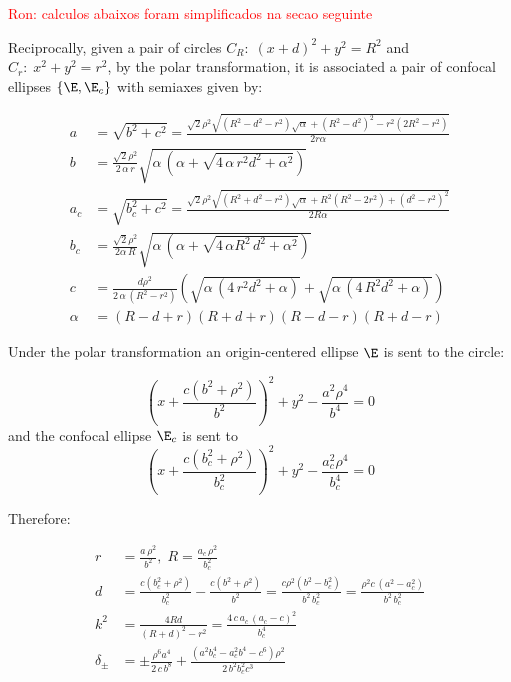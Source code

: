  
 \textcolor{red}{Ron: calculos abaixos foram simplificados na secao seguinte}
 
 
 Reciprocally, given a pair of circles $C_R:\; (x+d)^2+y^2=R^2$ and $C_r:\; x^2+y^2=r^2$, by the  polar transformation, 
 it is associated a pair of confocal ellipses $\{\E, \E_c\}$
 with semiaxes given by:
 
 \begin{align*}
     a&= \sqrt{b^2+c^2}=\frac{\sqrt{2}\rho^2\sqrt{ (R^2 - d^2 - r^2)\sqrt{\alpha} +(R^2 - d^2)^2  - r^2(2R^2 - r^2) }}{2r\alpha} \\
     b&= {\frac {\sqrt {2}{\rho}^{2}}{2\,\alpha\,r}\sqrt {\alpha\, \left( 
\alpha+\sqrt {4\,\alpha\,{r}^{2}{d}^{2}+{\alpha}^{2}} \right) }}
 \\
     a_c&= \sqrt{b_c^2+c^2} = \frac{\sqrt{2}\rho^2\sqrt{(R^2 + d^2 - r^2)\sqrt{\alpha} + R^2(R^2 - 2r^2) + (d^2 - r^2)^2 }}{2R\alpha}\\
     b_c&= {\frac {\sqrt {2}{\rho}^{2}}{2 \alpha\,R}\sqrt {\alpha\, \left( \alpha+
\sqrt {4\,\alpha {R}^{2}\,{d}^{2}+{\alpha}^{2}} \right) }}
 \\
     c&= {\frac {d{\rho}^{2}}{2\,\alpha\, \left( R^2-r^2 \right)    } \left( \sqrt {\alpha\, \left( 4\, {r}^{2} d^2+\alpha
 \right) }+\sqrt {\alpha\, \left( 4\,{R}^{2}{d}^{2}+\alpha \right) }
 \right) }
\\
     \alpha&=(R - d + r)(R + d + r)(R - d - r)(R + d - r)
 \end{align*}
 
 Under the polar transformation an origin-centered ellipse $\E$ is sent to the circle:

\[ \left( x+{\frac {c \left( {b}^{2}+\rho^{2} \right) }{{b}^{2}}}
 \right) ^{2}+{y}^{2}-{\frac {{a}^{2}\rho^{4}}{{b}^4}}=0\]
 and the confocal ellipse $\E_c$ is sent to
 \[ \left( x+\frac {c \left( b_c^{2}+\rho^{2} \right) }{b_c^2}
 \right) ^{2}+{y}^{2}-{\frac {a_c^{2}\rho^{4}}{b_c^4}}=0\]
 
Therefore:

\begin{align*} r&=\frac{a \,\rho^2}{b^2},\; R=\frac{a_c\, \rho^2}{b_c^2}\\
d&=\frac {c \left( b_c^{2}+\rho^{2} \right) }{b_c^2}-\frac {c \left( b^{2}+\rho^{2} \right) }{b^2}=\frac{c \rho^2(b^2 - b_c^2)}{b^2\, b_c^2}=\frac{\rho^2 c\, (a^2 - a_c^2)}{b^2\, b_c^2}\\
  k^2&=\frac{4Rd}{(R+d)^2-r^2}=\frac{4 \,c\, a_c\,(a_c - c)^2    }{b_c^4}\\
  \delta_{\pm}&=\pm {\frac {\rho^{6}{a}^{4}}{2\,c\, {b}^{8}}}+{\frac { \left( {a}^{2} b_c^{4}-a_c^{2}{b}^{4}-{c}^{6} \right) \rho^{2}}{2\,{b}^{2}  b_c^{2} {c}^{3}}}
\end{align*}

